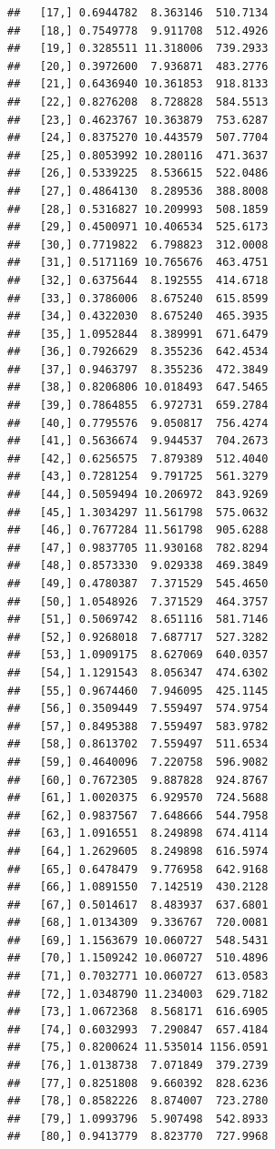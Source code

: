 \documentclass[article]{jss}\usepackage[]{graphicx}\usepackage[]{xcolor}
\makeatletter
\newenvironment{kframe}{%
 \def\at@end@of@kframe{}%
 \ifinner\ifhmode%
  \def\at@end@of@kframe{\end{minipage}}%
  \begin{minipage}{\columnwidth}%
 \fi\fi%
 \def\FrameCommand##1{\hskip\@totalleftmargin \hskip-\fboxsep
 \colorbox{shadecolor}{##1}\hskip-\fboxsep
     \hskip-\linewidth \hskip-\@totalleftmargin \hskip\columnwidth}%
 \MakeFramed {\advance\hsize-\width
   \@totalleftmargin\z@ \linewidth\hsize
   \@setminipage}}%
 {\par\unskip\endMakeFramed%
 \at@end@of@kframe}
\newenvironment{knitrout}{}{} %
\makeatother
\begin{document}
\begin{knitrout}
\begin{kframe}
\begin{verbatim}
##   [17,] 0.6944782  8.363146  510.7134
##   [18,] 0.7549778  9.911708  512.4926
##   [19,] 0.3285511 11.318006  739.2933
##   [20,] 0.3972600  7.936871  483.2776
##   [21,] 0.6436940 10.361853  918.8133
##   [22,] 0.8276208  8.728828  584.5513
##   [23,] 0.4623767 10.363879  753.6287
##   [24,] 0.8375270 10.443579  507.7704
##   [25,] 0.8053992 10.280116  471.3637
##   [26,] 0.5339225  8.536615  522.0486
##   [27,] 0.4864130  8.289536  388.8008
##   [28,] 0.5316827 10.209993  508.1859
##   [29,] 0.4500971 10.406534  525.6173
##   [30,] 0.7719822  6.798823  312.0008
##   [31,] 0.5171169 10.765676  463.4751
##   [32,] 0.6375644  8.192555  414.6718
##   [33,] 0.3786006  8.675240  615.8599
##   [34,] 0.4322030  8.675240  465.3935
##   [35,] 1.0952844  8.389991  671.6479
##   [36,] 0.7926629  8.355236  642.4534
##   [37,] 0.9463797  8.355236  472.3849
##   [38,] 0.8206806 10.018493  647.5465
##   [39,] 0.7864855  6.972731  659.2784
##   [40,] 0.7795576  9.050817  756.4274
##   [41,] 0.5636674  9.944537  704.2673
##   [42,] 0.6256575  7.879389  512.4040
##   [43,] 0.7281254  9.791725  561.3279
##   [44,] 0.5059494 10.206972  843.9269
##   [45,] 1.3034297 11.561798  575.0632
##   [46,] 0.7677284 11.561798  905.6288
##   [47,] 0.9837705 11.930168  782.8294
##   [48,] 0.8573330  9.029338  469.3849
##   [49,] 0.4780387  7.371529  545.4650
##   [50,] 1.0548926  7.371529  464.3757
##   [51,] 0.5069742  8.651116  581.7146
##   [52,] 0.9268018  7.687717  527.3282
##   [53,] 1.0909175  8.627069  640.0357
##   [54,] 1.1291543  8.056347  474.6302
##   [55,] 0.9674460  7.946095  425.1145
##   [56,] 0.3509449  7.559497  574.9754
##   [57,] 0.8495388  7.559497  583.9782
##   [58,] 0.8613702  7.559497  511.6534
##   [59,] 0.4640096  7.220758  596.9082
##   [60,] 0.7672305  9.887828  924.8767
##   [61,] 1.0020375  6.929570  724.5688
##   [62,] 0.9837567  7.648666  544.7958
##   [63,] 1.0916551  8.249898  674.4114
##   [64,] 1.2629605  8.249898  616.5974
##   [65,] 0.6478479  9.776958  642.9168
##   [66,] 1.0891550  7.142519  430.2128
##   [67,] 0.5014617  8.483937  637.6801
##   [68,] 1.0134309  9.336767  720.0081
##   [69,] 1.1563679 10.060727  548.5431
##   [70,] 1.1509242 10.060727  510.4896
##   [71,] 0.7032771 10.060727  613.0583
##   [72,] 1.0348790 11.234003  629.7182
##   [73,] 1.0672368  8.568171  616.6905
##   [74,] 0.6032993  7.290847  657.4184
##   [75,] 0.8200624 11.535014 1156.0591
##   [76,] 1.0138738  7.071849  379.2739
##   [77,] 0.8251808  9.660392  828.6236
##   [78,] 0.8582226  8.874007  723.2780
##   [79,] 1.0993796  5.907498  542.8933
##   [80,] 0.9413779  8.823770  727.9968

\end{verbatim}
\end{kframe}
\end{knitrout}
\end{document}
